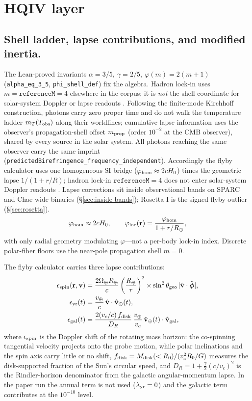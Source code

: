 \documentclass[11pt]{amsart}
\newcommand{\leanid}[1]{\nolinkurl{#1}}
\begin{document}
\section{HQIV layer}\label{sec:hqiv}

\subsection{Shell ladder, lapse contributions, and modified inertia.}
The Lean-proved invariants
\(\alpha=3/5,\ \gamma=2/5,\ \varphi(m)=2(m+1)\) (\texttt{alpha\_eq\_3\_5},
\texttt{phi\_shell\_def}) fix the algebra. Hadron lock-in uses
$m=\texttt{referenceM}=4$ elsewhere in the corpus; it is \emph{not} the shell
coordinate for solar-system Doppler or lapse readouts
\cite{hqiv-kirchhoff-paper}. Following the finite-mode Kirchhoff
construction, photons carry zero proper time and do not walk the temperature
ladder $m_T(T_{\rm obs})$ along their worldlines; cumulative lapse information
uses the observer's propagation-shell offset $m_{\rm prop}$ (order $10^{-2}$ at
the CMB observer), shared by every source in the solar system. All photons
reaching the same observer carry the same imprint
(\leanid{predictedBirefringence\_frequency\_independent}).
Accordingly the flyby calculator uses one homogeneous SI bridge
($\varphi_{\rm hom}\approx 2cH_0$) times the geometric lapse $1/(1+r/R)$; hadron lock-in
$\texttt{referenceM}=4$ does not enter solar-system Doppler readouts
\cite{hqiv-kirchhoff-paper}. Lapse corrections sit inside observational bands on SPARC
and Chae wide binaries (\S\ref{sec:inside-bands}); Rosetta-I is the signed flyby
outlier (\S\ref{sec:rosetta}).
\begin{equation}
\varphi_{\rm hom}\approx 2cH_0,\qquad
\varphi_{\rm loc}(\mathbf r)=\frac{\varphi_{\rm hom}}{1+r/R_\oplus},
\end{equation}
with only radial geometry modulating $\varphi$---not a per-body lock-in index.
Discrete polar-fiber floors use the near-pole propagation shell $m=0$.

The flyby calculator carries three lapse contributions:
\begin{align}
\epsilon_{\rm spin}(\mathbf r,\mathbf v) &= \frac{2\Omega_\oplus R_\oplus}{c}
  \left(\frac{R_\oplus}{r}\right)^2
  \times \sin^2\theta_{\rm geo}\,
  |\hat{\mathbf v}\cdot\hat{\boldsymbol\phi}|, \\
\epsilon_{\rm yr}(t) &= \frac{v_\oplus}{c}\,\hat{\mathbf v}\cdot\hat{\mathbf v}_\oplus(t), \\
\epsilon_{\rm gal}(t) &= \frac{2(v_c/c)\,f_{\rm disk}}{D_R}
  \,\frac{v_\oplus}{v_c}\,\hat{\mathbf v}_\oplus(t)\cdot\hat{\mathbf v}_{\rm gal},
\end{align}
where $\epsilon_{\rm spin}$ is the Doppler shift of the rotating mass horizon: the
co-spinning tangential velocity projects onto the probe motion, while polar inclinations
and the spin axis carry little or no shift,
$f_{\rm disk}=M_{\rm disk}(<R_0)/(v_c^2 R_0/G)$ measures the disk-supported fraction of the
Sun's circular speed, and $D_R=1+\tfrac{\gamma}{2}(c/v_c)^2$ is the Rindler-horizon
denominator from the galactic angular-momentum lapse. In the paper run the annual term is
not used ($\lambda_{\rm yr}=0$) and the galactic term contributes at the $10^{-10}$ level.
\end{document}
